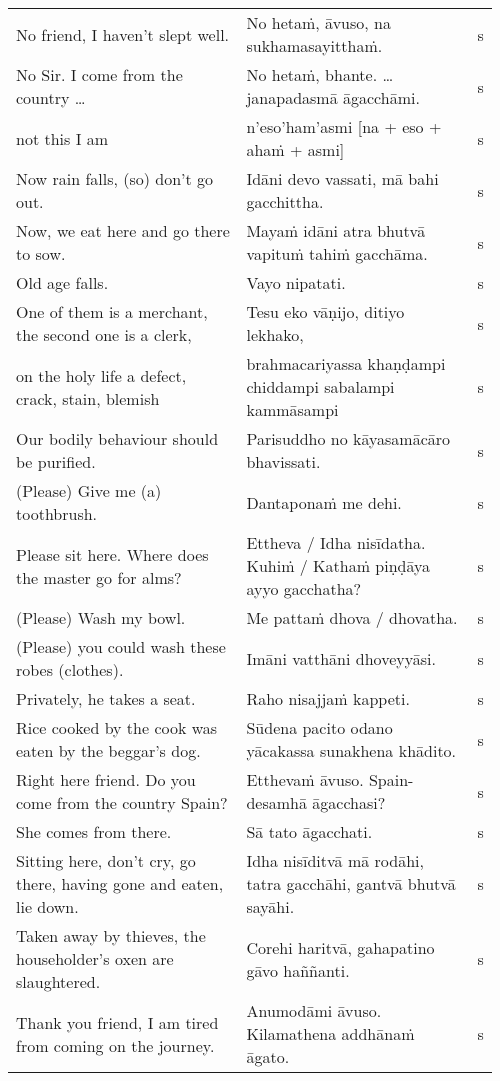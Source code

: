\documentclass[a5paper]{memoir}
\begin{document}
\begin{longtable}{L{0.48\linewidth} L{0.48\linewidth} H}
No friend, I haven't slept well. & No hetaṁ, āvuso, na sukhamasayitthaṁ. & s\\[0pt]
No Sir. I come from the country \ldots{} & No hetaṁ, bhante. \ldots{} janapadasmā āgacchāmi. & s\\[0pt]
not this I am & n'eso'ham'asmi [na + eso + ahaṁ + asmi] & s\\[0pt]
Now rain falls, (so) don't go out. & Idāni devo vassati, mā bahi gacchittha. & s\\[0pt]
Now, we eat here and go there to sow. & Mayaṁ idāni atra bhutvā vapituṁ tahiṁ gacchāma. & s\\[0pt]
Old age falls. & Vayo nipatati. & s\\[0pt]
One of them is a merchant, the second one is a clerk, & Tesu eko vāṇijo, ditiyo lekhako, & s\\[0pt]
on the holy life a defect, crack, stain, blemish & brahmacariyassa khaṇḍampi chiddampi sabalampi kammāsampi & s\\[0pt]
Our bodily behaviour should be purified. & Parisuddho no kāyasamācāro bhavissati. & s\\[0pt]
(Please) Give me (a) toothbrush. & Dantaponaṁ me dehi. & s\\[0pt]
Please sit here. Where does the master go for alms? & Ettheva / Idha nisīdatha. Kuhiṁ / Kathaṁ piṇḍāya ayyo gacchatha? & s\\[0pt]
(Please) Wash my bowl. & Me pattaṁ dhova / dhovatha. & s\\[0pt]
(Please) you could wash these robes (clothes). & Imāni vatthāni dhoveyyāsi. & s\\[0pt]
Privately, he takes a seat. & Raho nisajjaṁ kappeti. & s\\[0pt]
Rice cooked by the cook was eaten by the beggar's dog. & Sūdena pacito odano yācakassa sunakhena khādito. & s\\[0pt]
Right here friend. Do you come from the country Spain? & Etthevaṁ āvuso. Spain-desamhā āgacchasi? & s\\[0pt]
She comes from there. & Sā tato āgacchati. & s\\[0pt]
Sitting here, don't cry, go there, having gone and eaten, lie down. & Idha nisīditvā mā rodāhi, tatra gacchāhi, gantvā bhutvā sayāhi. & s\\[0pt]
Taken away by thieves, the householder's oxen are slaughtered. & Corehi haritvā, gahapatino gāvo haññanti. & s\\[0pt]
Thank you friend, I am tired from coming on the journey. & Anumodāmi āvuso. Kilamathena addhānaṁ āgato. & s\\[0pt]

\end{longtable}
\end{document}
